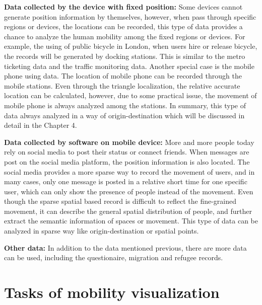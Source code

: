 \textbf{Data collected by the device with fixed position:} Some devices cannot generate position information by themselves, however, when  pass through specific regions or devices, the locations can be recorded, this type of data provides a chance to analyze the human mobility among the fixed regions or devices. For example, the using of public bicycle in London\cite{wood2011visualizing}, when users hire or release bicycle, the records will be generated by docking stations. This is similar to the metro ticketing\cite{itoh2016visual} data and the traffic monitoring data\cite{guo2011tripvista}. Another special case is the mobile phone using data. The location of mobile phone can be recorded through the mobile stations. Even through the triangle localization, the relative accurate location can be calculated, however, due to some practical issue, the movement of mobile phone is always analyzed among the stations\cite{wu2016telcovis}. In summary, this type of data always analyzed in a way of origin-destination which will be discussed in detail in the Chapter 4. 

\textbf{Data collected by software on mobile device:} More and more people today rely on social media to post their status or connect friends. When messages are post on the social media platform, the position information is also located. The social media provides a more sparse way to record the movement of users, and in many cases, only one message is posted in a relative short time for one specific user, which can only show the presence of people instead of the movement. Even though the sparse spatial based record is difficult to reflect the fine-grained movement, it can describe the general spatial distribution of people\cite{chae2014public}, and further extract the semantic information of spaces\cite{andrienko2013thematic} or movement\cite{itoh2016visual}.  This type of data can be analyzed in sparse way like origin-destination or spatial points.
 
\textbf{Other data:} In addition to the data mentioned previous, there are more data can be used, including the questionaire\cite{zhao2008activities}, migration and refugee\cite{wood2010visualisation} records.


\section{Tasks of mobility visualization}



